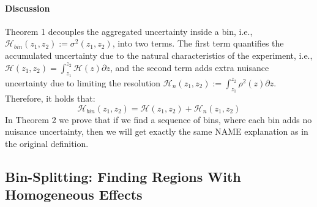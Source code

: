 \documentclass[twoside]{article}
\begin{document}
\paragraph{Discussion}

Theorem 1 decouples the aggregated uncertainty inside a bin, i.e.,
\(\mathcal{H}_{bin}(z_1, z_2) := \sigma^2(z_1, z_2)\), into two
terms. The first term quantifies the accumulated uncertainty due to
the natural characteristics of the experiment, i.e.,
\(\mathcal{H}(z_1, z_2) = \int_{z_1}^{z_2}\mathcal{H}(z) \partial z\),
and the second term adds extra nuisance uncertainty due to limiting
the resolution
\(\mathcal{H}_n(z_1, z_2) := \int_{z_1}^{z_2}\rho^2(z) \partial z
\). Therefore, it holds that:
\begin{equation}
  \label{eq:uncertainty_bin}
  \mathcal{H}_{bin}(z_1, z_2) = \mathcal{H}(z_1, z_2) + \mathcal{H}_n(z_1, z_2)
\end{equation}
%
In Theorem 2 we prove that if we find a sequence of bins, where each
bin adds no nuisance uncertainty, then we will get exactly the same
NAME explanation as in the original definition. 



\subsection{Bin-Splitting: Finding Regions With Homogeneous Effects}
\label{sec:interval-spliting}
\end{document}
